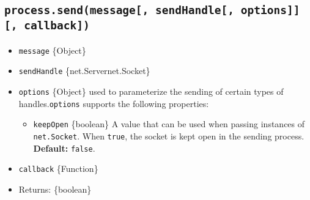 \begin{Shaded}
\begin{Highlighting}[]
\OperatorTok{=} \NormalTok{(}\NormalTok{)}\OperatorTok{;}

\NormalTok{(}\NormalTok{())}\OperatorTok{;}
\CommentTok{/*}
\CommentTok{  \{}
\CommentTok{  \}}
\CommentTok{*/}
\end{Highlighting}
\end{Shaded}

\subsection{\texorpdfstring{\texttt{process.send(message{[},\ sendHandle{[},\ options{]}{]}{[},\ callback{]})}}{process.send(message{[}, sendHandle{[}, options{]}{]}{[}, callback{]})}}\label{process.sendmessage-sendhandle-options-callback}

\begin{itemize}
\tightlist
\item
  \texttt{message} \{Object\}
\item
  \texttt{sendHandle} \{net.Server\textbar net.Socket\}
\item
  \texttt{options} \{Object\} used to parameterize the sending of
  certain types of handles.\texttt{options} supports the following
  properties:

  \begin{itemize}
  \tightlist
  \item
    \texttt{keepOpen} \{boolean\} A value that can be used when passing
    instances of \texttt{net.Socket}. When \texttt{true}, the socket is
    kept open in the sending process. \textbf{Default:} \texttt{false}.
  \end{itemize}
\item
  \texttt{callback} \{Function\}
\item
  Returns: \{boolean\}
\end{itemize}

